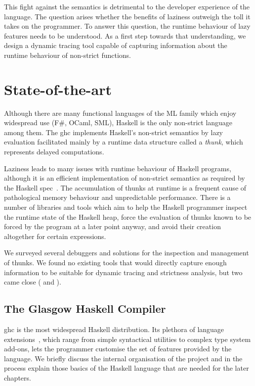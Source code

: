 \documentclass[thesis=B,english]{FITthesis}[2019/12/23]
\begin{document}
This fight against the semantics is detrimental to the developer experience of
the language. The question arises whether the benefits of laziness outweigh the
toll it takes on the programmer. To answer this question, the runtime behaviour
of lazy features needs to be understood. As a first step towards that
understanding, we design a dynamic tracing tool capable of capturing
information about the runtime behaviour of non-strict functions.


\chapter{State-of-the-art} \label{sec:state-of-the-art}
Although there are many functional languages of the ML family which enjoy
widespread use (F\#, OCaml, SML), Haskell is the only non-strict language among
them. The \acrfull{ghc} implements Haskell's non-strict semantics by lazy
evaluation facilitated mainly by a runtime data structure called a
\textit{thunk}, which represents delayed computations.

Laziness leads to many issues with runtime behaviour of Haskell programs,
although it is an efficient implementation of non-strict semantics as required
by the Haskell spec~\cite{haskell2010}. The accumulation of thunks at runtime is
a frequent cause of pathological memory behaviour and unpredictable
performance. There is a number of libraries and tools which aim to help the
Haskell programmer inspect the runtime state of the Haskell heap, force the
evaluation of thunks known to be forced by the program at a later point anyway,
and avoid their creation altogether for certain expressions.

We surveyed several debuggers and solutions for the inspection and management
of thunks. We found no existing tools that would directly capture enough
information to be suitable for dynamic tracing and strictness analysis, but two
came close ( and ).


\section{The Glasgow Haskell Compiler} \label{sec:ghc}
\acrshort{ghc} is the most widespread Haskell distribution. Its plethora of
language extensions~\cite{ghc-language-extensions}, which range from simple
syntactical utilities to complex type system add-ons, lets the programmer
customise the set of features provided by the language. We briefly discuss the
internal organisation of the project and in the process explain those basics of
the Haskell language that are needed for the later chapters.
\end{document}
